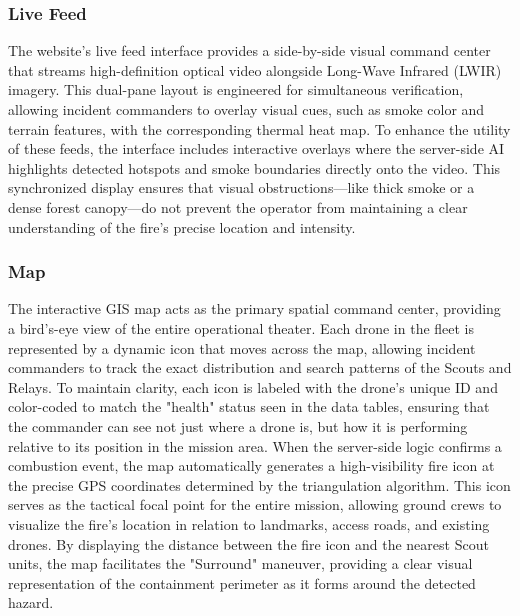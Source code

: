 \documentclass[journal, onecolumn]{IEEEtran}
\begin{document}
\subsubsection{Live Feed}
The website's live feed interface provides a side-by-side visual command center that streams high-definition optical video alongside Long-Wave Infrared (LWIR) imagery. This dual-pane layout is engineered for simultaneous verification, allowing incident commanders to overlay visual cues, such as smoke color and terrain features, with the corresponding thermal heat map. To enhance the utility of these feeds, the interface includes interactive overlays where the server-side AI highlights detected hotspots and smoke boundaries directly onto the video. This synchronized display ensures that visual obstructions—like thick smoke or a dense forest canopy—do not prevent the operator from maintaining a clear understanding of the fire’s precise location and intensity.

\subsubsection{Map}
The interactive GIS map acts as the primary spatial command center, providing a bird's-eye view of the entire operational theater. Each drone in the fleet is represented by a dynamic icon that moves across the map, allowing incident commanders to track the exact distribution and search patterns of the Scouts and Relays. To maintain clarity, each icon is labeled with the drone's unique ID and color-coded to match the "health" status seen in the data tables, ensuring that the commander can see not just where a drone is, but how it is performing relative to its position in the mission area.
When the server-side logic confirms a combustion event, the map automatically generates a high-visibility fire icon at the precise GPS coordinates determined by the triangulation algorithm. This icon serves as the tactical focal point for the entire mission, allowing ground crews to visualize the fire's location in relation to landmarks, access roads, and existing drones. By displaying the distance between the fire icon and the nearest Scout units, the map facilitates the "Surround" maneuver, providing a clear visual representation of the containment perimeter as it forms around the detected hazard.
\end{document}
